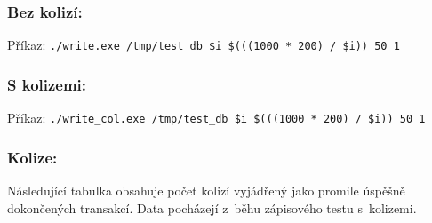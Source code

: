 \subsubsection*{Bez kolizí:}
\setlength{\parindent}{0cm}
Příkaz: \verb|./write.exe /tmp/test_db $i $(((1000 * 200) / $i)) 50 1|

\begin{center}
  
\end{center}

\newpage

\subsubsection*{S kolizemi:}
Příkaz: \verb|./write_col.exe /tmp/test_db $i $(((1000 * 200) / $i)) 50 1|

\begin{center}
  
\end{center}

\setlength{\parindent}{1cm}
\subsubsection*{Kolize:}
Následující tabulka obsahuje počet kolizí vyjádřený jako promile úspěšně dokončených
transakcí. Data pocházejí z~běhu zápisového testu s~kolizemi.

\begin{center}
  
\end{center}



